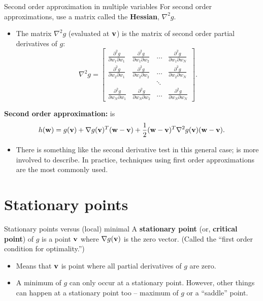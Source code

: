 \documentclass{beamer}
\theoremstyle{example}
\newcommand{\m}[1]{\begin{bmatrix}#1\end{bmatrix}}
\begin{document}
\begin{frame}{Second order approximation in multiple variables}
    For second order approximations, use a matrix called the \textbf{Hessian}, $\nabla^2g$. \pause 
    \begin{itemize}
        \item The matrix $\nabla^2g$ (evaluated at ${\bf v}$) is the matrix of second order partial derivatives of $g$:
        \[\nabla^2g = \m{\frac{\partial^2 g}{\partial w_1\partial w_1} & \frac{\partial^2 g}{\partial w_1\partial w_2} & \ldots & \frac{\partial^2 g}{\partial w_1\partial w_N} \\ 
        \frac{\partial^2 g}{\partial w_2\partial w_1} & \frac{\partial^2 g}{\partial w_2\partial w_2} & \ldots & \frac{\partial^2 g}{\partial w_2\partial w_N} \\ 
         & & \ddots & \\ 
        \frac{\partial^2 g}{\partial w_N \partial w_1} & \frac{\partial^2 g}{\partial w_N\partial w_2} & \ldots & \frac{\partial^2 g}{\partial w_N\partial w_N}
        }.\]
    \end{itemize}

    \pause
    {\bf Second order approximation:} is 
        \[h({\bf w}) = g({\bf v}) + \nabla g({\bf v})^T({\bf w} - {\bf v}) + \frac12({\bf w}-{\bf v})^T\nabla^2g({\bf v})({\bf w} - {\bf v}). \]
    \vspace*{-12pt}
    \begin{itemize}
        \pause
        \item There is something like the second derivative test in this general case; is more involved to describe. In practice, techniques using first order approximations are the most commonly used.
    \end{itemize}
\end{frame}

\section{Stationary points}

\begin{frame}{Stationary points versus (local) minimal}
    A \textbf{stationary point} (or, \textbf{critical point}) of $g$ is a point ${\bf v}$ where $\nabla g({\bf v})$ is the zero vector. (Called the ``first order condition for optimality.'')
    \pause
    \begin{itemize}
        \item Means that ${\bf v}$ is point where all partial derivatives of $g$ are zero.
        \pause
        \item A minimum of $g$ can only occur at a stationary point. However, other things can happen at a stationary point too {--} maximum of $g$ or a ``saddle'' point.
    \end{itemize}
\end{frame}
\end{document}
